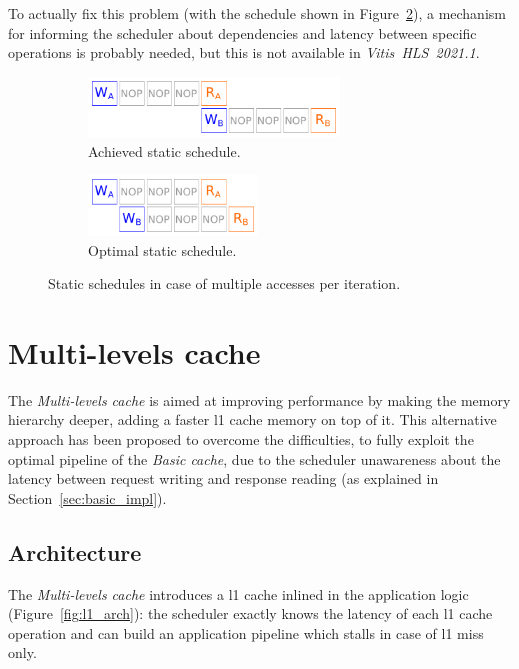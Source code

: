 \documentclass[11pt,a4paper,oneside]{memoir}
\begin{document}
\bigskip
To actually fix this problem (with the schedule shown in
Figure~\ref{subfig:fixed_sched_desired}), a mechanism for informing the
scheduler about dependencies and latency between specific operations is
probably needed, but this is not available in
\emph{Vitis\texttrademark~HLS~2021.1}.

\begin{figure}[!htb]
	\centering
	\begin{subfigure}[b]{.4\textwidth}
		\centering
		\includegraphics[height=1.6cm]{fixed_schedule_issue}
		\caption{Achieved static schedule.}
		\label{subfig:fixed_sched_issue}
	\end{subfigure}
	\hfill
	\begin{subfigure}[b]{.4\textwidth}
		\centering
		\includegraphics[height=1.6cm]{fixed_schedule_desired}
		\caption{Optimal static schedule.}
		\label{subfig:fixed_sched_desired}
	\end{subfigure}
	\caption{Static schedules in case of multiple accesses per iteration.}
	\label{fig:fixed_sched_issue}
\end{figure}

\chapter{Multi-levels cache}
The \emph{Multi-levels cache} is aimed at improving performance by making the
memory hierarchy deeper, adding a faster \ac{l1} cache memory on top of it.
This alternative approach has been proposed to overcome the difficulties, to
fully exploit the optimal pipeline of the \emph{Basic cache}, due to the
scheduler unawareness about the latency between request writing and response
reading (as explained in Section~\ref{sec:basic_impl}).

\section{Architecture}
The \emph{Multi-levels cache} introduces a \ac{l1} cache inlined in the
application logic (Figure~\ref{fig:l1_arch}): the scheduler exactly knows the
latency of each \ac{l1} cache operation and can build an application pipeline
which stalls in case of \ac{l1} miss only.
\end{document}
